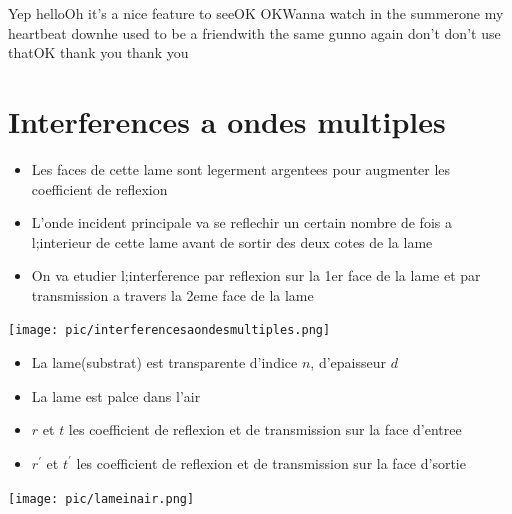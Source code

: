 \documentclass[12pt]{book}
\begin{document}
            Yep helloOh it's a nice feature to seeOK OKWanna watch in the summerone my heartbeat downhe used to be a friendwith the same gunno again don't don't use thatOK thank you thank you
        \section{Interferences a ondes multiples }    
            \begin{center}
                \begin{minipage}{0.7\linewidth}
                    \begin{itemize}
                        \item Les faces de cette lame sont legerment argentees pour augmenter les coefficient de reflexion 
                        \item L'onde incident principale va se reflechir un certain nombre de fois a l;interieur de cette lame avant de sortir des deux cotes de la lame 
                        \item On va etudier l;interference  par reflexion sur la 1er face de la lame et par transmission a travers la 2eme face de la lame
                    \end{itemize}
                \end{minipage}
                \begin{minipage}{0.29\linewidth}
                    \texttt{[image: pic/interferencesaondesmultiples.png]}
                \end{minipage}
            \end{center}
            \begin{center}
                \begin{minipage}{0.54\linewidth}
                    \begin{itemize}
                        \item La lame(substrat) est transparente d'indice $n$, d'epaisseur $d$ 
                        \item La lame est palce dans l'air
                        \item $r$ et $t$ les coefficient de reflexion et de transmission sur la face d'entree
                        \item $r^{'}$ et $t^{'}$ les coefficient de reflexion et de transmission sur la face d'sortie
                    \end{itemize}
                \end{minipage}
                \begin{minipage}{0.45\linewidth}
                    \texttt{[image: pic/lameinair.png]}
                \end{minipage}
            \end{center}
\end{document}
